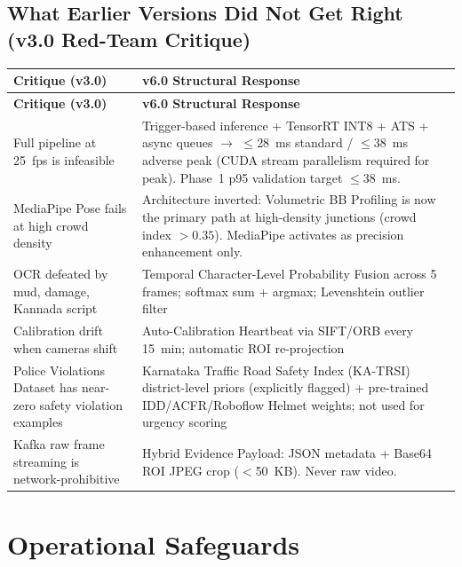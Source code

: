 \documentclass[11pt,a4paper]{article}
\begin{document}
\subsection*{What Earlier Versions Did Not Get Right (v3.0 Red-Team Critique)}

\begin{longtable}{L{6cm} L{9cm}}
    \toprule
    \color{white}\textbf{Critique (v3.0)} & \color{white}\textbf{v6.0 Structural Response} \\
    \midrule
    \endfirsthead
    \toprule
    \color{white}\textbf{Critique (v3.0)} & \color{white}\textbf{v6.0 Structural Response} \\
    \midrule
    \endhead
    \bottomrule
    \endfoot

    Full pipeline at 25~fps is infeasible & Trigger-based inference + TensorRT INT8 + ATS + async queues $\rightarrow$ $\leq$28~ms standard / $\leq$38~ms adverse peak (CUDA stream parallelism required for peak). Phase~1 p95 validation target $\leq 38$~ms. \\
    MediaPipe Pose fails at high crowd density & Architecture inverted: Volumetric BB Profiling is now the primary path at high-density junctions (crowd index $> 0.35$). MediaPipe activates as precision enhancement only. \\
    OCR defeated by mud, damage, Kannada script & Temporal Character-Level Probability Fusion across 5 frames; softmax sum + argmax; Levenshtein outlier filter \\
    Calibration drift when cameras shift & Auto-Calibration Heartbeat via SIFT/ORB every 15~min; automatic ROI re-projection \\
    Police Violations Dataset has near-zero safety violation examples & Karnataka Traffic Road Safety Index (KA-TRSI)~\cite{katrsi2023} district-level priors (explicitly flagged) + pre-trained IDD/ACFR/Roboflow Helmet weights; not used for urgency scoring \\
    Kafka raw frame streaming is network-prohibitive & Hybrid Evidence Payload: JSON metadata + Base64 ROI JPEG crop ($<$50~KB). Never raw video. \\
\end{longtable}

\section{Operational Safeguards}
\end{document}

